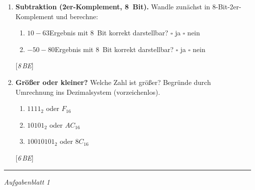 \documentclass[11pt,a4paper]{scrartcl}
\newenvironment{aufgaben}{%
	\begin{enumerate}[leftmargin=*,label=\textbf{Aufgabe~\arabic*:}, itemsep=0.6em]
	}{\end{enumerate}}
\newcommand{\punkte}[1]{\hfill{\small[\textit{#1\,BE}]}}
\begin{document}
\begin{aufgaben}
		\item \textbf{Subtraktion (2er-Komplement, 8~Bit).} Wandle zunächst in 8-Bit-2er-Komplement und berechne:
		\begin{enumerate}[label*=\alph*)]
			\item \(10 - 63\)\quad Ergebnis mit 8~Bit korrekt darstellbar? \(\square\) ja \(\square\) nein
			\item \(-50 - 80\)\quad Ergebnis mit 8~Bit korrekt darstellbar? \(\square\) ja \(\square\) nein
		\end{enumerate}
		\punkte{8}
		
		\item \textbf{Größer oder kleiner?} Welche Zahl ist größer? Begründe durch Umrechnung ins Dezimalsystem (vorzeichenlos).
		\begin{enumerate}[label*=\alph*)]
			\item \(1111_2\) \; oder \; \(F_{16}\)
			\item \(10101_2\) \; oder \; \(AC_{16}\)
			\item \(10010101_2\) \; oder \; \(8C_{16}\)
		\end{enumerate}
		\punkte{6}
	\end{aufgaben}
	
	\vfill
	\hrule
	\small\emph{Aufgabenblatt 1}
	
\end{document}
